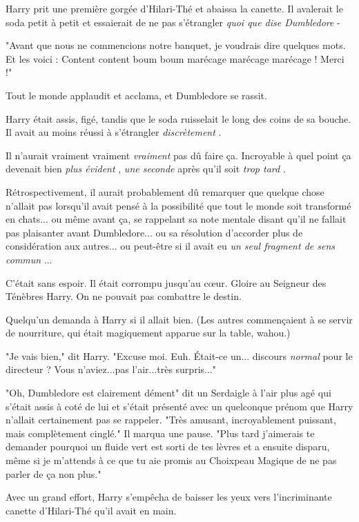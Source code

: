 Harry prit une première gorgée d'Hilari-Thé et abaissa la canette. Il avalerait le soda petit à petit et essaierait de ne pas s'étrangler \emph{quoi que dise Dumbledore}  -

"Avant que nous ne commencions notre banquet, je voudrais dire quelques mots. Et les voici : Content content boum boum marécage marécage marécage ! Merci !"

Tout le monde applaudit et acclama, et Dumbledore se rassit.

Harry était assis, figé, tandis que le soda ruisselait le long des coins de sa bouche. Il avait au moins réussi à s'étrangler \emph{discrètement} .

Il n'aurait vraiment vraiment \emph{vraiment}  pas dû faire ça. Incroyable à quel point ça devenait bien \emph{plus évident} , \emph{une seconde}  après qu'il soit \emph{trop tard} .

Rétrospectivement, il aurait probablement dû remarquer que quelque chose n'allait pas lorsqu'il avait pensé à la possibilité que tout le monde soit transformé en chats... ou même avant ça, se rappelant sa note mentale disant qu'il ne fallait pas plaisanter avant Dumbledore... ou sa résolution d'accorder plus de considération aux autres... ou peut-être si il avait eu \emph{un seul fragment de sens commun} ...

C'était sans espoir. Il était corrompu jusqu'au cœur. Gloire au Seigneur des Ténèbres Harry. On ne pouvait pas combattre le destin.

Quelqu'un demanda à Harry si il allait bien. (Les autres commençaient à se servir de nourriture, qui était magiquement apparue sur la table, wahou.)

"Je vais bien," dit Harry. "Excuse moi. Euh. Était-ce un... discours \emph{normal } pour le directeur ? Vous n'aviez...pas l'air...très surpris..."

"Oh, Dumbledore est clairement dément" dit un Serdaigle à l'air plus agé qui s'était assis à coté de lui et s'était présenté avec un quelconque prénom que Harry n'allait certainement pas se rappeler. "Très amusant, incroyablement puissant, mais complètement cinglé." Il marqua une pause. "Plus tard j'aimerais te demander pourquoi un fluide vert est sorti de tes lèvres et a ensuite disparu, même si je m'attends à ce que tu aie promis au Choixpeau Magique de ne pas parler de ça non plus."

Avec un grand effort, Harry s'empêcha de baisser les yeux vers l'incriminante canette d'Hilari-Thé qu'il avait en main.

